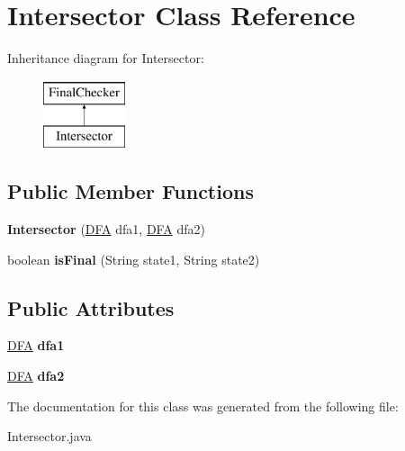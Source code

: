 \hypertarget{class_intersector}{}\section{Intersector Class Reference}
\label{class_intersector}
Inheritance diagram for Intersector\+:\begin{figure}[H]
\begin{center}
\leavevmode
\includegraphics[height=2.000000cm]{class_intersector}
\end{center}
\end{figure}
\subsection*{Public Member Functions}
\begin{DoxyCompactItemize}
\item 
\mbox{\label{class_intersector_a5c472043f38adb9c1b6594572a58769b}} 
{\bfseries Intersector} (\mbox{\hyperlink{class_d_f_a}{D\+FA}} dfa1, \mbox{\hyperlink{class_d_f_a}{D\+FA}} dfa2)
\item 
\mbox{\label{class_intersector_a4f4317eaaf1abd9d80285d159c8d29a4}} 
boolean {\bfseries is\+Final} (String state1, String state2)
\end{DoxyCompactItemize}
\subsection*{Public Attributes}
\begin{DoxyCompactItemize}
\item 
\mbox{\label{class_intersector_ac9dba4e634f6f15d5cfe47b06242d231}} 
\mbox{\hyperlink{class_d_f_a}{D\+FA}} {\bfseries dfa1}
\item 
\mbox{\label{class_intersector_af518f1c4b8c91e0e5df23e24badab80e}} 
\mbox{\hyperlink{class_d_f_a}{D\+FA}} {\bfseries dfa2}
\end{DoxyCompactItemize}


The documentation for this class was generated from the following file\+:\begin{DoxyCompactItemize}
\item 
Intersector.\+java\end{DoxyCompactItemize}
